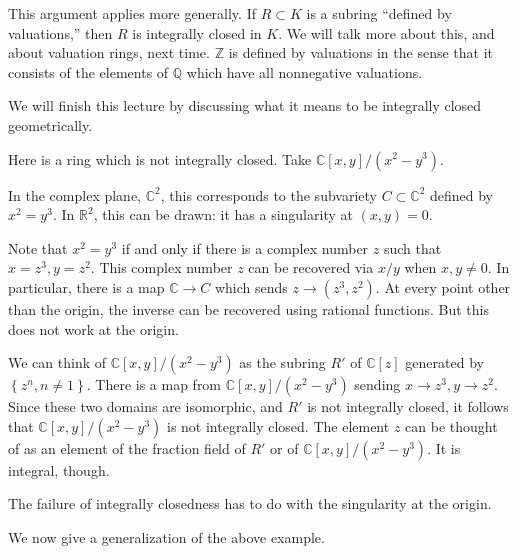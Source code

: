 This argument applies more generally. If $R \subset K$ is a subring ``defined
by valuations,'' then $R$ is integrally closed in $K$.  We will talk more about
this, and about valuation rings, next time.  
$\mathbb{Z}$ is defined by valuations in the sense that it consists of the
elements of $\mathbb{Q}$ which have all nonnegative valuations.

We will finish this lecture by discussing what it means to be integrally closed
geometrically.

\begin{example} 
Here is a ring which is not integrally closed. Take  $\mathbb{C}[x, y]/(x^2 - y^3)$.

In the complex plane, $\mathbb{C}^2$, this corresponds to the subvariety $C
\subset \mathbb{C}^2$ defined by $x^2 =
y^3$.  In $\mathbb{R}^2$, this can be drawn: it has a singularity at $(x,y)=0$.  

Note that $x^2 = y^3$ if and only if there is a complex number $z$ such that $x
= z^3, y = z^2$. This complex number $z$ can be recovered via $x/y$ when $x,y
\neq 0$. In particular, there is a map $\mathbb{C} \to C$ which sends $z \to
(z^3, z^2)$.  At every point other than the origin, the inverse can be
recovered using rational functions. But this does not work at the origin. 

We can think of $\mathbb{C}[x,y]/(x^2 - y^3)$ as the subring $R'$ of $\mathbb{C}[z]$
generated by $\left\{z^n, n \neq 1\right\}$.  There is a map from
$\mathbb{C}[x,y]/(x^2 - y^3)$ sending $x \to z^3, y \to z^2$.  Since these two
domains are isomorphic, and $R'$ is not integrally closed, it follows that
$\mathbb{C}[x,y]/(x^2 - y^3)$ is not integrally closed.
The element $z$ can be thought of as an element of the fraction field of $R'$
or of $\mathbb{C}[x,y]/(x^2 - y^3)$.  
It is integral, though. 

The failure of integrally closedness has to do with the singularity at the
origin.  
\end{example} 


We now give a generalization of the above example.

